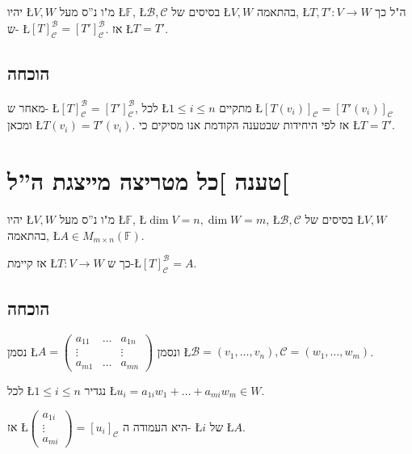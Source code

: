\documentclass[english,hebrew]{article}
\begin{document}
יהיו \L{$V,W$} מ"ו נ\textquotedblright ס מעל \L{$\mathbb{F}$},
\L{$\mathcal{B},\mathcal{C}$} בסיסים של \L{$V,W$} בהתאמה, \L{$T,T':V\to W$}
ה"ל כך ש- \L{$[T]_{\mathcal{C}}^{\mathcal{B}}=[T']_{\mathcal{C}}^{\mathcal{B}}$}.
אז \L{$T=T'$}.

\subsection{הוכחה}

מאחר ש- \L{$[T]_{\mathcal{C}}^{\mathcal{B}}=[T']_{\mathcal{C}}^{\mathcal{B}}$},
לכל \L{$1\le i\le n$} מתקיים \L{$[T(v_{i})]_{\mathcal{C}}=[T'(v_{i})]_{\mathcal{C}}$}
ומכאן \L{$T(v_{i})=T'(v_{i})$}. אז לפי היחידות שבטענה הקודמת אנו
מסיקים כי \L{$T=T'$}.

\section{טענה {]}כל מטריצה מייצגת ה\textquotedblright ל{[}}

יהיו \L{$V,W$} מ"ו נ\textquotedblright ס מעל \L{$\mathbb{F}$},
\L{$\dim V=n,\dim W=m$}, \L{$\mathcal{B},\mathcal{C}$} בסיסים של
\L{$V,W$} בהתאמה, \L{$A\in M_{m\times n}(\mathbb{F})$}.

אז קיימת \L{$T:V\to W$} כך ש-\L{$[T]_{\mathcal{C}}^{\mathcal{B}}=A$}.

\subsection{הוכחה}

נסמן \L{$A=\begin{pmatrix}a_{11} & \dots & a_{1n}\\
\vdots &  & \vdots\\
a_{m1} & \dots & a_{mn}
\end{pmatrix}$} ונסמן \L{$\mathcal{B}=(v_{1},\dots,v_{n}),\mathcal{C}=(w_{1},\dots,w_{m})$}.

לכל \L{$1\le i\le n$} נגדיר \L{$u_{i}=a_{1i}w_{1}+\dots+a_{mi}w_{m}\in W$}. 

אז \L{$\begin{pmatrix}a_{1i}\\
\vdots\\
a_{mi}
\end{pmatrix}=[u_{i}]_{\mathcal{C}}$} היא העמודה ה- \L{$i$} של \L{$A$}.
\end{document}

